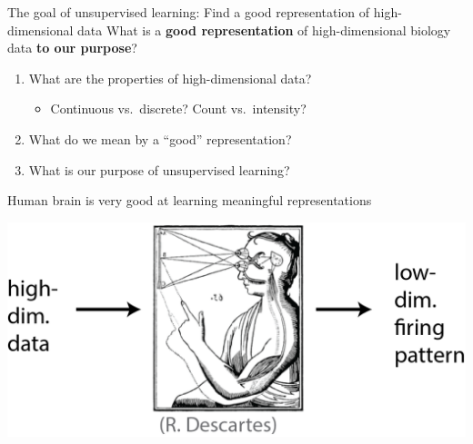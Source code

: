 \documentclass[
  ignorenonframetext,
  aspectratio=169]{beamer}
\providecommand{\tightlist}{%
  \setlength{\itemsep}{0pt}\setlength{\parskip}{0pt}}
\begin{document}
\begin{frame}{The goal of unsupervised learning: Find a good
representation of high-dimensional data}
\protect\hypertarget{the-goal-of-unsupervised-learning-find-a-good-representation-of-high-dimensional-data}{}
What is a \textbf{good representation} of high-dimensional biology data
\textbf{to our purpose}?

\begin{enumerate}
\item
  What are the properties of high-dimensional data?

  \begin{itemize}
  \tightlist
  \item
    Continuous vs.~discrete? Count vs.~intensity?
  \end{itemize}
\item
  What do we mean by a ``good'' representation?
\item
  What is our purpose of unsupervised learning?
\end{enumerate}
\end{frame}

\begin{frame}{Human brain is very good at learning meaningful
representations}
\protect\hypertarget{human-brain-is-very-good-at-learning-meaningful-representations}{}
\scriptsize

\begin{center}\includegraphics[width=.7\linewidth]{./Vis/unsupervised/descartes} \end{center}

\normalsize
\end{frame}
\end{document}
